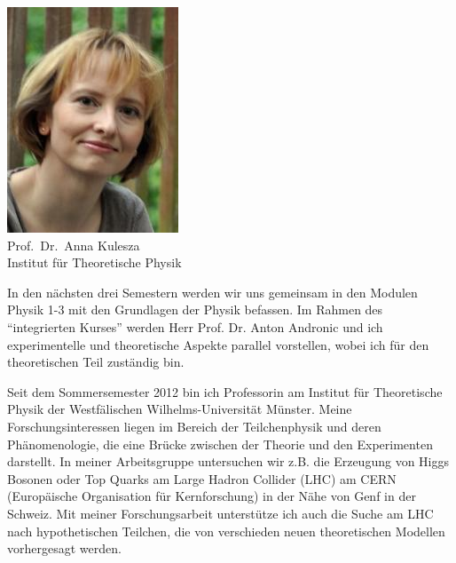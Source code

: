 \begin{multicols}{2}
\begin{center}
\includegraphics[width=0.71\columnwidth]{res/vorstellungsfotos/kulesza.jpeg}\\
\smallskip
Prof.\ Dr.\ Anna Kulesza\\
Institut für Theoretische Physik
\end{center}

In den nächsten drei Semestern werden wir uns gemeinsam in den Modulen Physik 1-3 mit den Grundlagen der Physik befassen. Im Rahmen des “integrierten Kurses” werden Herr Prof. Dr. Anton Andronic und ich experimentelle und theoretische Aspekte parallel vorstellen, wobei ich für den theoretischen Teil zuständig bin.

Seit dem Sommersemester 2012 bin ich Professorin am Institut für Theoretische Physik der Westfälischen Wilhelms-Universität Münster. Meine Forschungsinteressen liegen im Bereich der Teilchenphysik und deren Phänomenologie, die eine Brücke zwischen der Theorie und den Experimenten darstellt. In meiner Arbeitsgruppe untersuchen wir z.B. die Erzeugung von Higgs Bosonen oder Top Quarks am Large Hadron Collider (LHC) am CERN (Europäische Organisation für Kernforschung) in der Nähe von Genf in der Schweiz. Mit meiner Forschungsarbeit unterstütze ich auch die Suche am LHC nach hypothetischen Teilchen, die von verschieden neuen theoretischen Modellen vorhergesagt werden. 


\end{multicols}
